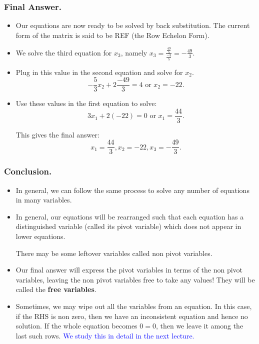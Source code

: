 \begin{frame}%
  \frametitle{Final Answer.}
  \begin{itemize}%
 
\item Our equations are now ready to be solved by back substitution.
The current form of the matrix is said to be REF (the Row Echelon Form).

\item We solve the third equation for $x_3$, namely $x_3 =
\frac{\frac{49}{5}}{\frac{-3}{5}}=-\frac{49}{3}$.

\item Plug in this value in the second equation and solve for $x_2$.
$$-\frac{5}{3}x_2+2\frac{-49}{3}=4 \mbox{ or } x_2 = -22.$$

\item Use these values in the first equation to solve:
$$3x_1 + 2(-22) =0 \mbox{ or } x_1 = \frac{44}{3}.$$

This gives the final answer:
$$x_1=\frac{44}{3},x_2=-22,x_3=-\frac{49}{3}.$$

\end{itemize}
\end{frame}

\begin{frame}%
  \frametitle{Conclusion.}
  \begin{itemize}%
 
\item In general, we can follow the same process to solve any number of
equations in many variables.

\item In general, our equations will be rearranged such that each
equation has a distinguished variable (called its pivot variable) which
does not appear in lower equations.

There may be some leftover variables called non pivot variables.

\item Our final answer will express the pivot variables in terms of the
non pivot variables, leaving the non pivot variables free to take any
values!  They will be called the {\bf free variables}.

\item Sometimes, we may wipe out all the variables from an equation. In
this case, if the RHS is non zero, then we have an inconsistent equation
and hence no solution. If the whole equation becomes $0=0$, then we
leave it among the last such rows.
\textcolor{blue}{ We study this in detail in the next lecture.}


\end{itemize}
\end{frame}


